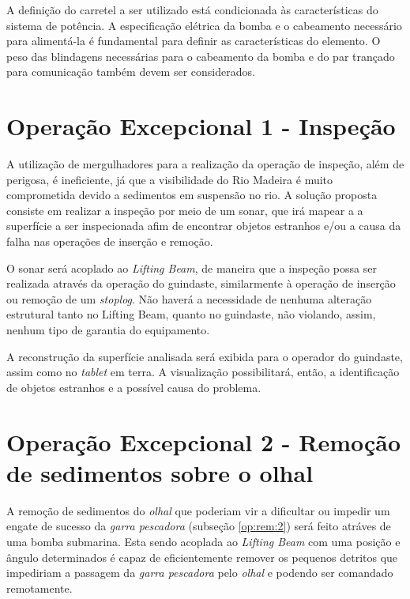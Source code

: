 A definição do carretel a ser utilizado está condicionada às características do
sistema de potência. A especificação elétrica da bomba e o cabeamento necessário
para alimentá-la é fundamental para definir as características do elemento. O
peso das blindagens necessárias para o cabeamento da bomba e do par trançado
para comunicação também devem ser considerados.

\section{Operação Excepcional 1 - Inspeção}
\label{sis:sol:1}
A utilização de mergulhadores para a realização da operação de inspeção, além de
perigosa, é ineficiente, já que a visibilidade do Rio Madeira é muito
comprometida devido a sedimentos em suspensão no rio. A solução proposta
consiste em realizar a inspeção por meio de um sonar, que irá mapear a a
superfície a ser inspecionada afim de encontrar objetos estranhos e/ou a causa
da falha nas operações de inserção e remoção.

O sonar será acoplado ao \emph{Lifting Beam}, de maneira que a inspeção possa
ser realizada através da operação do guindaste, similarmente à operação de
inserção ou remoção de um \emph{stoplog}. Não haverá a necessidade de nenhuma
alteração estrutural tanto no Lifting Beam, quanto no guindaste, não violando,
assim, nenhum tipo de garantia do equipamento.

A reconstrução da superfície analisada será exibida para o operador do
guindaste, assim como no \emph{tablet} em terra. A visualização possibilitará,
então, a identificação de objetos estranhos e a possível causa do problema.

\section{Operação Excepcional 2 - Remoção de sedimentos sobre o olhal}

A remoção de sedimentos do \emph{olhal} que poderiam vir a dificultar ou impedir
um engate de sucesso da \emph{garra pescadora} (subseção \ref{op:rem:2}) será
feito atráves de uma bomba submarina. Esta sendo acoplada ao \emph{Lifting
Beam} com uma posição e ângulo determinados é capaz de eficientemente remover os
pequenos detritos que impediriam a passagem da \emph{garra pescadora} pelo
\emph{olhal} e podendo ser comandado remotamente.
